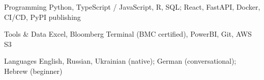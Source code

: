 

\begin{cvskills}

  \cvskill
    {Programming} %
    {Python, TypeScript / JavaScript, R, SQL; React, FastAPI, Docker, CI/CD, PyPI publishing} %

  \cvskill
    {Tools \& Data} %
    {Excel, Bloomberg Terminal (BMC certified), PowerBI, Git, AWS S3} %

  \cvskill
    {Languages} %
    {English, Russian, Ukrainian (native); German (conversational); Hebrew (beginner)} %

\end{cvskills}
